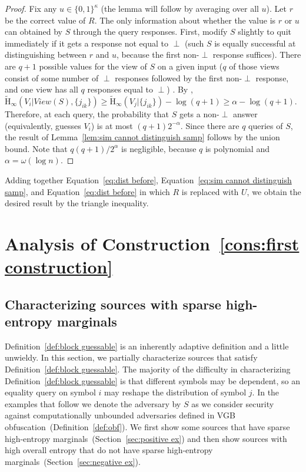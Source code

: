 \documentclass[11pt]{article}
\newcommand{\secref}[1]{\mbox{Section~\ref{#1}}}
\newcommand{\defref}[1]{\mbox{Definition~\ref{#1}}}
\newcommand{\lemref}[1]{\mbox{Lemma~\ref{#1}}}
\newcommand{\consref}[1]{\mbox{Construction~\ref{#1}}}
\newcommand{\zo}{\ensuremath{\{0, 1\}}}
\newcommand{\Hav}{\tilde{\mathrm{H}}_\infty}
\newcommand{\subsetEntropy}{\alpha}
\begin{document}
\begin{proof}
Fix any $u\in \zo^\kappa$ (the lemma will follow by averaging over all $u$). Let $r$ be the correct value of $R$.
The only information about whether the value is $r$ or $u$ can obtained by $S$ through the query responses. First, modify $S$ slightly to quit immediately if it gets a response not equal to $\perp$ (such $S$ is equally successful at distinguishing between $r$ and $u$, because the first non-$\perp$ response suffices). There are $q+1$ possible values for the view of $S$ on a given input ($q$ of those views consist of some number of $\perp$ responses followed by the first non-$\perp$ response, and one view has all $q$ responses equal to $\perp$) . By \cite[Lemma 2.2b]{DBLP:journals/siamcomp/DodisORS08}, $\Hav(V_i | View(S), \{j_{ik}\}) \ge \Hav(V_j | \{j_{ik}\}) - \log (q+1) \ge \subsetEntropy - \log(q+1)$. Therefore, at each query, the probability that $S$ gets a non-$\perp$ answer (equivalently, guesses $V_i$) is at most $(q+1)2^{-\subsetEntropy}$. Since there are $q$ queries of $S$, the result of \lemref{lem:sim cannot distinguish samp} follows by the union bound. Note that  $q(q+1)/2^\subsetEntropy$ is negligible, because $q$ is polynomial and $\subsetEntropy=\omega(\log n)$.
\end{proof}

Adding together Equation~\ref{eq:dist before}, Equation~\ref{eq:sim cannot distinguish samp}, and Equation~\ref{eq:dist before} in which $R$ is replaced with $U$, we obtain the desired result by the triangle inequality.\section{Analysis of \consref{cons:first construction}}
\label{sec:construction analysis}

\subsection{Characterizing sources with sparse high-entropy marginals}
\label{sec:characterize}

\defref{def:block guessable} is an inherently adaptive definition and a little unwieldy.  In this section, we partially characterize sources that satisfy \defref{def:block guessable}.
The majority of the difficulty in characterizing \defref{def:block guessable} is that different symbols may be dependent, so an equality query on symbol $i$ may reshape the distribution of symbol $j$.  In the examples that follow we denote the adversary by $S$ as we consider security against computationally unbounded adversaries defined in VGB obfuscation~(\defref{def:obf}).  We first show some sources that have sparse high-entropy marginals~(\secref{sec:positive ex}) and then show sources with high overall entropy that do not have sparse high-entropy marginals~(\secref{sec:negative ex}).
\end{document}
